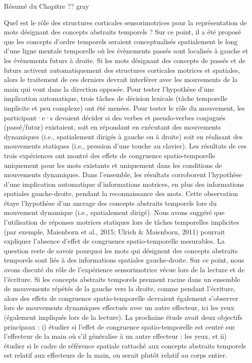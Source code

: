 \documentclass[
  a4paper,12pt,twoside,onecolumn,openright,final,oldfontcommands]{memoir}
\newcommand\chaptercolor{gray}
\newcommand\getcurrentref[1]{
 \ifnumequal{\value{#1}}{0}
  {??}
  {\the\value{#1}}
}
\begin{document}
\begin{vplace}[1]

\begin{summary}{Résumé du Chapitre\getcurrentref{chapter}}{\chaptercolor}

Quel est le rôle des structures corticales sensorimotrices pour la représentation de mots désignant des concepts abstraits temporels ? Sur ce point, il a été proposé que les concepts d’ordre temporels seraient conceptualisés spatialement le long d’une ligne mentale temporelle où les évènements passés sont localisés à gauche et les évènements futurs à droite. Si les mots désignant des concepts de passés et de futurs activent automatiquement des structures corticales motrices et spatiales, alors le traitement de ces derniers devrait interférer avec les mouvements de la main qui vont dans la direction opposée. Pour tester l’hypothèse d’une implication automatique, trois tâches de décision lexicale (tâche temporelle implicite et peu complexe) ont été menées. Pour tester le rôle du mouvement, les participant·e·s devaient décider si des verbes et pseudo-verbes conjugués (passé/futur) existaient, soit en répondant en exécutant des mouvements dynamiques (i.e., spatialement dirigés à gauche ou à droite) soit en réalisant des mouvements statiques (i.e., pression d'une touche au clavier). Les résultats de ces trois expériences ont montré des effets de congruence spatio-temporelle uniquement pour les mots existants et uniquement dans les conditions de mouvements dynamiques. Dans l'ensemble, les résultats corroborent l'hypothèse d'une implication automatique d'informations motrices, en plus des informations spatiales gauche-droite, pendant la reconnaissance des mots. Cette observation étaye l’hypothèse d’un ancrage des concepts abstraits temporels lors du mouvement dynamique (i.e., spatialement dirigé). Nous avons suggéré que l’utilisation de réponses motrices statiques lors de tâches temporelles implicites (par exemple, Maienborn et al., 2015; Ulrich \& Maienborn, 2011) pourrait expliquer l’absence d’effet de congruence spatio-temporelle mesurables. La question reste de savoir pourquoi les mots qui désignent des concepts abstraits temporels sont liés à des informations spatiales gauche-droite. Sur ce point, nous avons discuté du rôle de l’expérience sensorimotrice vécue lors de la lecture et de l’écriture. Si les concepts abstraits temporels prennent racine dans un ensemble de mouvements répétés de la gauche vers la droite, comme pendant l’écriture, alors des effets de congruence spatio-temporelle devraient également s’observer lors de mouvements dynamiques effectués avec un autre effecteur, ici les yeux (également impliqués lors de la lecture). La prochaine étude avait deux objectifs principaux : i) étudier si l’effet de congruence spatio-temporelle est centré sur l’effecteur de la main où s’il généralise à un autre effecteur : les yeux, et ii) étudier si le cadre de référence spatiale rattaché aux concepts abstraits temporels est relatif aux effecteurs de la main, ou serait plutôt relatif au corps entier. 

\end{summary}

\end{vplace}
\end{document}
